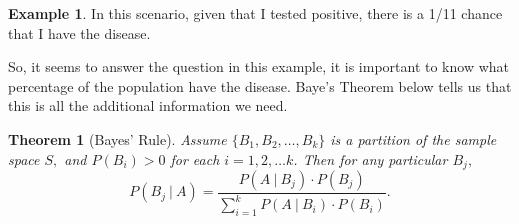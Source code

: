 \documentclass[
]{book}
\newtheorem{theorem}{Theorem}[chapter]
\theoremstyle{definition}
\theoremstyle{definition}
\newtheorem{example}{Example}[chapter]
\theoremstyle{definition}
\theoremstyle{definition}
\theoremstyle{remark}
\begin{document}
\begin{example}
In this scenario, given that I tested positive, there is a 1/11 chance that I have the disease.

So, it seems to answer the question in this example, it is important to know what percentage of the population have the disease. Baye's Theorem below tells us that this is all the additional information we need.
\end{example}

\begin{theorem}[Bayes' Rule]
\protect\hypertarget{thm:Bayes-rule}{}\label{thm:Bayes-rule}Assume \(\{B_1, B_2, \ldots, B_k\}\) is a partition of the sample space \(S,\) and \(P(B_i) > 0\) for each \(i = 1, 2, \ldots k\). Then for any particular \(B_j,\) \[P(B_j ~|~ A) = \frac{P(A~|~B_j)\cdot P(B_j)}{\sum_{i=1}^k P(A~|~B_i)\cdot P(B_i)}.\]
\end{theorem}
\end{document}
